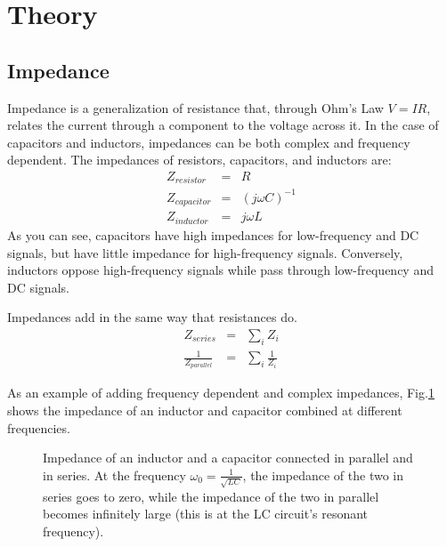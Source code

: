 \documentclass[12pt]{article}
\begin{document}
\section*{Theory}

\subsection*{Impedance}
Impedance is a generalization of resistance that, through Ohm's Law $V=IR$, relates the current through a component to the voltage across it. In the case of capacitors and inductors, impedances can be both complex and frequency dependent. The impedances of resistors, capacitors, and inductors are:
\begin{eqnarray}
Z_{resistor} &=& R\nonumber\\
Z_{capacitor} &=& (j\omega C)^{-1} \nonumber \\
Z_{inductor} &=& j\omega L \nonumber
\end{eqnarray}
As you can see, capacitors have high impedances for low-frequency and DC signals, but have little impedance for high-frequency signals. Conversely, inductors oppose high-frequency signals while pass through low-frequency and DC signals.

Impedances add in the same way that resistances do.
\begin{eqnarray}
Z_{series} &=& \sum_i{Z_i}\nonumber\\
\frac{1}{Z_{parallel}} &=& \sum_i{\frac{1}{Z_i}}\nonumber
\end{eqnarray}

As an example of adding frequency dependent and complex impedances, Fig.\ref{fig:LCimpedances} shows the impedance of an inductor and capacitor combined at different frequencies.
\begin{figure}[H]
\caption{Impedance of an inductor and a capacitor connected in parallel and in series. At the frequency $\omega_0=\frac{1}{\sqrt{LC}}$, the impedance of the two in series goes to zero, while the impedance of the two in parallel becomes infinitely large (this is at the LC circuit's resonant frequency).}
\label{fig:LCimpedances}
\end{figure}
\end{document}
